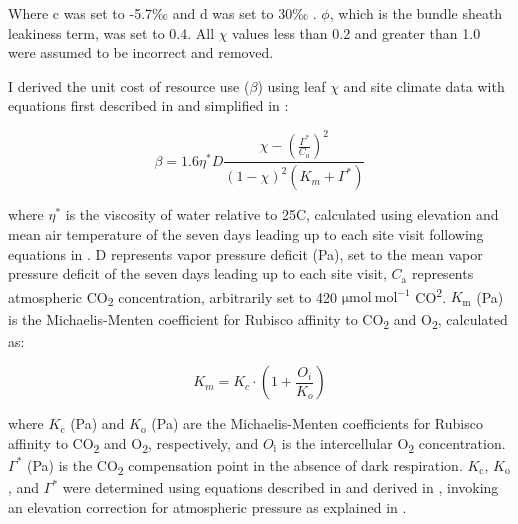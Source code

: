 \noindent Where c was set to -5.7‰ and d was set to 30‰ . $\phi$, which is the bundle sheath leakiness term, was set to 0.4. All $\chi$ values less than 0.2 and greater than 1.0 were assumed to be incorrect and removed.
    
I derived the unit cost of resource use ($\beta$) using leaf $\chi$ and site climate data with equations first described in  and simplified in :

\begin{equation}
    \label{eq_4.5}
    \beta = 1.6\eta^{*} D \frac{\chi - (\frac{\Gamma^*}{C_{a}})^{2}}{(1 - \chi)^{2}(K_{m} + \Gamma^{*})}
\end{equation}
    
\noindent where $\eta^{*}$ is the viscosity of water relative to 25\textdegree{}C, calculated using elevation and mean air temperature of the seven days leading up to each site visit following equations in . D represents vapor pressure deficit (Pa), set to the mean vapor pressure deficit of the seven days leading up to each site visit, $C_\mathrm{a}$ represents atmospheric CO\textsubscript{2} concentration, arbitrarily set to 420 $\mathrm{\mu mol\ mol^{-1}}$ CO\textsuperscript{2}. $K_\mathrm{m}$ (Pa) is the Michaelis-Menten coefficient for Rubisco affinity to CO\textsubscript{2} and O\textsubscript{2}, calculated as:
    
\begin{equation} \label{eq_4.6}
    K_{m} = K_{c} \cdot \left ( 1 + \frac{O_i}{K_o} \right )
\end{equation}

\noindent where $K_\mathrm{c}$ (Pa) and $K_\mathrm{o}$ (Pa) are the Michaelis-Menten coefficients for Rubisco affinity to CO\textsubscript{2} and O\textsubscript{2}, respectively, and $O_\mathrm{i}$  is the intercellular O\textsubscript{2} concentration. $\Gamma^{*}$ (Pa) is the CO\textsubscript{2} compensation point in the absence of dark respiration. $K_\mathrm{c}$, $K_\mathrm{o}$, and $\Gamma^{*}$ were determined using equations described in  and derived in , invoking an elevation correction for atmospheric pressure as explained in .
\clearpage

